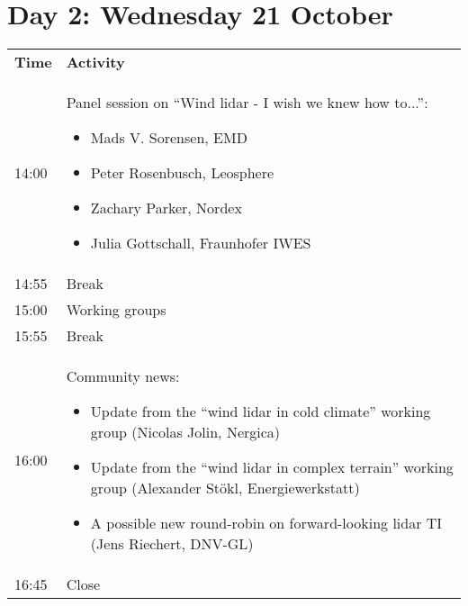 \section{Day 2: Wednesday 21 October}

\begin{table}[!h]
    \centering
    \begin{tabular}{@{}
        |p{}
        |p{}
        |@{}}
    \rowcolor{Task32Blue2} \textbf{Time} & \textbf{Activity} \\
    14:00 & Panel session on “Wind lidar - I wish we knew how to...”:
        \begin{itemize}
            \item Mads V. Sorensen, EMD
            \item Peter Rosenbusch, Leosphere
            \item  Zachary Parker, Nordex
            \item Julia Gottschall, Fraunhofer IWES
        \end{itemize} \\
    14:55 & Break \\
    15:00 & Working groups \\
    15:55 & Break \\
    16:00 & Community news: 
        \begin{itemize}
            \item Update from the “wind lidar in cold climate” working group (Nicolas Jolin, Nergica)
            \item Update from the “wind lidar in complex terrain” working group (Alexander Stökl, Energiewerkstatt)
            \item A possible new round-robin on forward-looking lidar TI (Jens Riechert, DNV-GL)
        \end{itemize}\\
    16:45 & Close
    \end{tabular}
    \label{tab:day2-agenda}
\end{table}